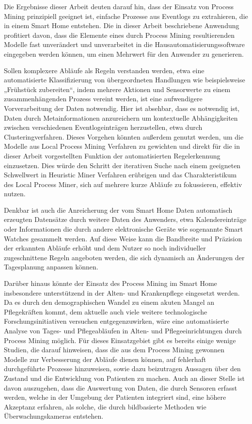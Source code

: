 Die Ergebnisse dieser Arbeit deuten darauf hin, dass der Einsatz von Process Mining prinzipiell geeignet ist, einfache Prozesse aus Eventlogs zu extrahieren, die in einem Smart Home entstehen. Die in dieser Arbeit beschriebene Anwendung profitiert davon, dass die Elemente eines durch Process Mining resultierenden Modelle fast unverändert und unverarbeitet in die Hausautomatisierungssoftware eingegeben werden können, um einen Mehrwert für den Anwender zu generieren. 

Sollen komplexere Abläufe als Regeln verstanden werden, etwa eine automatisierte Klassifizierung von übergeordneten Handlungen wie beispielsweise „Frühstück zubereiten“, indem mehrere Aktionen und Sensorwerte zu einem zusammenhängenden Prozess vereint werden, ist eine aufwendigere Vorverarbeitung der Daten notwendig. Hier ist absehbar, dass es notwendig ist, Daten durch Metainformationen anzureichern um kontextuelle Abhängigkeiten zwischen verschiedenen Eventlogeinträgen herzustellen, etwa durch Clusteringverfahren. 
Dieses Vorgehen könnten außerdem genutzt werden, um die Modelle aus Local Process Mining Verfahren zu gewichten und direkt für die in dieser Arbeit vorgestellten Funktion der automatisierten Regelerkennung einzusetzen. Dies würde den Schritt der iterativen Suche nach einem geeigneten Schwellwert in Heuristic Miner Verfahren erübrigen und das Charakteristikum des Local Process Miner, sich auf mehrere kurze Abläufe zu fokussieren, effektiv nutzen.

Denkbar ist auch die Anreicherung der vom Smart Home Daten automatisch erzeugten Datensätze durch weitere Daten des Anwenders, etwa Kalendereinträge oder Informationen die durch andere elektronische Geräte wie sogenannte Smart Watches gesammelt werden. Auf diese Weise kann die Bandbreite und Präzision der erkannten Abläufe erhöht und dem Nutzer so noch individueller zugeschnittene Regeln angeboten werden, die sich dynamisch an Änderungen der Tagesplanung anpassen können.

Darüber hinaus könnte der Einsatz des Process Mining im Smart Home insbesondere unterstützend in der Alten- und Krankenpflege eingesetzt werden. Da es durch den demographischen Wandel zu einem akuten Mangel an Pflegekräften kommt, dem aktuelle auch viele weitere technologische Forschungsinitiativen versuchen entgegenzuwirken, wäre eine automatisierte Analyse von Tages- und Pflegeabläufen in Alten- und Pflegeeinrichtungen durch Process Mining möglich. Für dieses Einsatzgebiet gibt es bereits einige wenige Studien, die darauf hinweisen, dass die aus dem Process Mining gewonnen Modelle zur Verbesserung der Abläufe dienen können, auf fehlerhaft durchgeführte Prozesse hinzuweisen, sowie dazu beizutragen Aussagen über den Zustand und die Entwicklung von Patienten zu machen. Auch an dieser Stelle ist davon auszugehen, dass die Auswertung von Daten, die durch Sensoren erfasst werden, welche in der Umgebung der Patienten integriert sind, eine höhere Akzeptanz erfahren, als solche, die durch bildbasierte Methoden wie Überwachungskameras entstehen.

